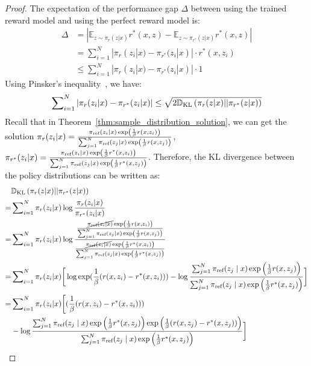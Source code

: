 \documentclass{article} %
\begin{document}
\begin{proof}
The expectation of the performance gap $\Delta$ between using the trained reward model and using the perfect reward model is:
\begin{align*}
\Delta &= |\mathbb{E}_{z\sim\pi_{r}(z|x)}r^{*}(x,z)-\mathbb{E}_{z\sim\pi_{r^{*}}(z|x)}r^{*}(x,z)|\\
&=\sum\nolimits^{N}_{i=1}|\pi_{r}(z_i|x)-\pi_{r^{*}}(z_i|x)|\cdot r^{*}(x,z_i)\\
&\leq \sum\nolimits^{N}_{i=1}|\pi_{r}(z_i|x)-\pi_{r^{*}}(z_i|x)|\cdot 1
\end{align*}
Using Pinsker's inequality~\citep{cover2006elements}, we have:
\begin{equation*}
\sum\nolimits^{N}_{i=1}|\pi_{r}(z_i|x)-\pi_{r^{*}}(z_i|x)|\leq \sqrt{2\mathbb{D}_{\textrm{KL}}\left(\pi_{r}(z|x)||\pi_{r^{*}}(z|x)\right)}
\end{equation*}
Recall that in Theorem~\ref{thm:sample_distribution_solution}, we can get the solution $\pi_{r}(z_i|x)=\frac{\pi_\text{ref}(z_i\mid x)\exp\left(\frac{1}{\beta}r(x, z_i)\right)}{\sum^{N}_{j=1}\pi_\text{ref}(z_j\mid x)\exp\left(\frac{1}{\beta}r(x, z_j)\right)}$, $\pi_{r^{*}}(z_i|x)=\frac{\pi_\text{ref}(z_i\mid x)\exp\left(\frac{1}{\beta}r^{*}(x, z_i)\right)}{\sum^{N}_{j=1}\pi_\text{ref}(z_j\mid x)\exp\left(\frac{1}{\beta}r^{*}(x, z_j)\right)}$. Therefore, 
the KL divergence between the policy distributions can be written as:
\begin{align*}
   &\kldiv\left(\pi_{r}(z|x)||\pi_{r^{*}}(z|x)\right)\\
   =&\sum\nolimits^{N}_{i=1}\pi_{r}(z_i|x)\log\frac{\pi_{r}(z_i|x)}{\pi_{r^{*}}(z_i|x)}\\
    =&\sum\nolimits^{N}_{i=1}\pi_{r}(z_i|x)\log\frac{\frac{\cancel{\piref(z_i\mid x)}\exp\left(\frac{1}{\beta}r(x, z_i)\right)}{\sum^{N}_{j=1}\piref(z_j\mid x)\exp\left(\frac{1}{\beta}r(x, z_j)\right)}}{\frac{\cancel{\piref(z_i\mid x)}\exp\left(\frac{1}{\beta}r^{*}(x, z_i)\right)}{\sum^{N}_{j=1}\piref(z_j\mid x)\exp\left(\frac{1}{\beta}r^{*}(x, z_j)\right)}}\\
    =&\sum\nolimits^{N}_{i=1}\pi_{r}(z_i|x)\bigg[\log\exp(\frac{1}{\beta}(r(x,z_i)-r^{*}(x,z_i)))-\log\frac{\sum^{N}_{j=1}\piref(z_j\mid x)\exp\left(\frac{1}{\beta}r(x, z_j)\right)}{\sum^{N}_{j=1}\piref(z_j\mid x)\exp\left(\frac{1}{\beta}r^{*}(x, z_j)\right)}\bigg]\\
    =&\sum\nolimits^{N}_{i=1}\pi_{r}(z_i|x)\bigg[(\frac{1}{\beta}(r(x,z_i)-r^{*}(x,z_i)))\\&-\log\frac{\sum^{N}_{j=1}\piref(z_j\mid x)\exp\left(\frac{1}{\beta}r^{*}(x, z_j)\right)\exp\left(\frac{1}{\beta}(r(x,z_j)-r^{*}(x, z_j))\right)}{\sum^{N}_{j=1}\piref(z_j\mid x)\exp\left(\frac{1}{\beta}r^{*}(x, z_j)\right)}\bigg]\\

\end{align*}
\end{proof}
\end{document}
